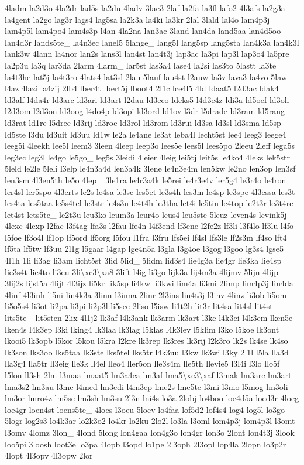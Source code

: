 {4ladm la2d3o 4la2dr lad5s la2du 4ladv 3lae3 2laf la2fa la3fl lafo2 4l3afs la2g3a la4gent la2go lag3r lags4 lag5sa la2k3a la4ki la3kr 2lal 3lald lal4o lam4p3j lam4p5l lam4po4 lam4s3p l4an 4la2na lan3ac 3land lan4da land5aa lan4d5oo lan4d3r lands5te\-\_\- la4n3ec lanel5 5lange\-\_\- lang5l lang5sp lang5sta lan4k3a lan4k3l lank3w 4lann la4nor lan2s lans3l lan4st lan4t3j lap3ac la3pi lap3l lap3o4 la5pre la2p3u la3q lar3da 2larm 4larm\-\_\- lar5st las3a4 lase4 la2si las3to 5lastt la3te la4t3he lat5j la4t3ro 4lats4 lat3sl 2lau 5lauf lau4st l2auw la3v lava3 la4vo 5law l4az 4lazi la4zij 2lb4 lber4t lbert5j lboot4 2l1c lce4l5 4ld ldaat5 l2d3ac ldak4 ld3alf l4da4r ld3arc ld3ari ld3art l2dau ld3eco ldeks5 l4d3e4z ldi3a ld5oef ld3oli l2d3om l2d3on ld3oog l4do4p ld3opi ld3ord ld1ov l3dr l5drade ld3ram ld5rang ld3rat ld1re l5dree ld3rij ld3roe ld3rol ld3rom ld3rui ld3sa ld3sl ld3sma ld5sp ld5ste l3du ld3uit ld3uu ld1w le2a le4ane le3at leba4l lecht5st lee4 leeg3 leege4 leeg5i 4leekh lee5l leem3 3leen 4leep leep3o lees5e lees5l lees5po 2leeu 2leff lega5s leg3ec leg3l le4go le5go\-\_\- leg5s 3leidi 4leier 4leig lei5tj leit5s le4ko4 4leks lek5str 5leld le2le 5leli l3elp le4n3a4d len3a4k 3lene le4n3e4m len5kw le2no len3op len3sf len3sm 4l3en5th le5o 4lep\-\_\- 3le1ra le4r3a4k le5rei le4r3e4v ler5g4 le3r4o le4ron ler4sl ler5spo 4l3erts le2s le4sa le3sc les5et le3s4h les3m le4sp le3spe 4l3essa les3t les4ta les5taa le5s4tel le3str le4s3u le4t4h le3tha let4i le5tin le4top le2t3r le3t4re let4st lets5te\-\_\- le2t3u leu3ko leum3a leur4o leus4 leu5ste 5leuz leven4s levink5j 4lexc 4lexp l2fac l3f4ag lfa3s l2fau lfe4n l4f3end lf3ene l2fe2z lf3li l3f4lo lf3lu l4fo l5foe lf3o4l lf1op lf5ord lf5org l5fou l1fra l3fru lfs5ei lf4sl lfs3le lf2s3m lf4so lft4 lf5ta lf5tw lf3uu 2l1g l5gaar l4gap lge4n5a l3gla l3g4oe l3gog l3goo lg3s4 lgse5 4l1h 1li li3ag li3am licht5st 3lid 5lid\-\_\- 5lidm lid3s4 lie4g3a lie4gr lie3ka lie4sp lie3s4t lie4to li3eu 3li\textbackslash{}xc3\textbackslash{}xa8 3lift l4ig li3go lijk3a lij4m3a 4lijmv 5lijn 4lijp 3lij2s lijst5a 4lijt 4l3ijz li5kr lik5sp li4kw li3kwi lim4a li3mi 2limp lim4p3j lin4da 4linf 4l3inh li5ni lin4k3a 3linn l3inna 2linr 2l3ins lin4t3j l3inv 4linz li3ob li5om li5o5s4 li3ot li2pa li3pi li2p3l li5see 2liso l5isw li1t2h lit3r lit4sa lit4sl lit4st lits5te\-\_\- lit5sten 2lix 4l1j2 lk3af l4k3ank lk3arm lk3art l3ke l4k3ei l4k3em lken5e lken4s l4k3ep l3ki lking4 lk3laa lk3lag l5klas l4k3lev l5klim l3ko l5koe lk3ont lkooi5 lk3opb l5kor l5kou l5kra l2kre lk3rep lk3res lk3rij l2k3ro lk2s lk4se lk4so lk3son lks3oo lks5taa lk3ste lks5tel lks5tr l4k3uu l3kw lk3wi l3ky 2l1l l5la lla3d lla3g4 lla5tr ll3eig lle3k ll4el lleo4 ller5on lle3s4m lle5th llevie5 l3l4i l3lo llo5f l5lon ll3sh 2lm l3maa lmaat5 lm3a4ca lm3af lma5\textbackslash{}xc3\textbackslash{}xaf l3mak lm3arc lm3art lma3s2 lm3au l3me l4med lm3edi l4m3ep lme2s lme5te l3mi l3mo l5mog lm3oli lm3or lmro4z lm5sc lm3sh lm3su 2l3n lni4s lo3a 2lobj lo4boo loe4d5a loed3r 4loeg loe4gr loen4st loens5te\-\_\- 4loes l3oeu 5loev lo4faa lof5d2 lof4s4 log4 log5l lo3go 5logr log2s3 lo4k3ar lo2k3o2 lo4kr lo2ku 2lo2l lo3la l3oml lom4p3j lom4p3l l3omt l3omv 4lomz 3lon\-\_\- 4lond 5long lon4gaa lon4g3o lon4gr lon3o 2lont lon4t3j 3look loo5pi 3loosh loot3e lo3pa 4lopb l3opd lo1pe 2l3oph 2l3opl lop4la 2lopn lo3p2r 4lopt 4l3opv 4l3opw 2lor }
